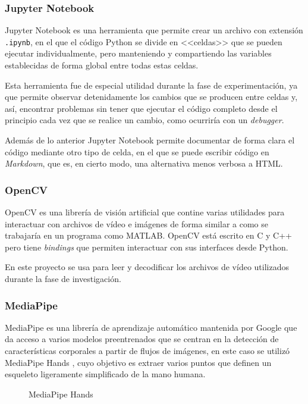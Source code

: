 \subsubsection{Jupyter Notebook}

Jupyter Notebook es una herramienta que permite crear un archivo con extensión
\texttt{.ipynb}, en el que el código Python se divide en <<celdas>> que se
pueden ejecutar individualmente, pero manteniendo y compartiendo las variables
establecidas de forma global entre todas estas celdas.

Esta herramienta fue de especial utilidad durante la fase de experimentación,
ya que permite observar detenidamente los cambios que se producen entre celdas
y, así, encontrar problemas sin tener que ejecutar el código completo desde el
principio cada vez que se realice un cambio, como ocurriría con un
\textit{debugger}.

Además de lo anterior Jupyter Notebook permite documentar de forma clara el
código mediante otro tipo de celda, en el que se puede escribir código en
\textit{Markdown}, que es, en cierto modo, una alternativa menos verbosa a HTML.

\subsubsection{OpenCV}

OpenCV es una librería de visión artificial que contine varias utilidades para
interactuar con archivos de vídeo e imágenes de forma similar a como se
trabajaría en un programa como MATLAB\@. OpenCV está escrito en C y C++ pero tiene
\textit{bindings} que permiten interactuar con sus interfaces desde Python.

En este proyecto se usa para leer y decodificar los archivos de vídeo utilizados
durante la fase de investigación.

\subsubsection{MediaPipe}

MediaPipe es una librería de aprendizaje automático mantenida por Google que da
acceso a varios modelos preentrenados que se centran en la detección de
características corporales a partir de flujos de imágenes, en este caso se
utilizó MediaPipe Hands \cite{zhang2020mediapipe}, cuyo objetivo es extraer
varios puntos que definen un esqueleto ligeramente simplificado de la mano
humana.

\begin{figure}[H]
      \centering
      \caption{MediaPipe Hands}
\end{figure}

